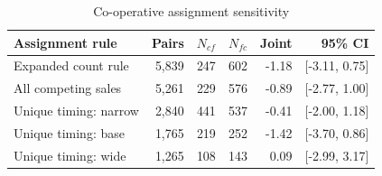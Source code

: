 \begin{table}[htbp]
\centering\small\singlespacing
\caption{Co-operative assignment sensitivity}\label{tab:coop}
\begin{tabular}{lrrrrr}
\toprule
Assignment rule & Pairs & $N_{cf}$ & $N_{fc}$ & Joint & 95\% CI \\
\midrule
Expanded count rule & 5,839 & 247 & 602 & -1.18 & [-3.11, 0.75] \\
All competing sales & 5,261 & 229 & 576 & -0.89 & [-2.77, 1.00] \\
Unique timing: narrow & 2,840 & 441 & 537 & -0.41 & [-2.00, 1.18] \\
Unique timing: base & 1,765 & 219 & 252 & -1.42 & [-3.70, 0.86] \\
Unique timing: wide & 1,265 & 108 & 143 & 0.09 & [-2.99, 3.17] \\
\bottomrule
\end{tabular}
\end{table}
